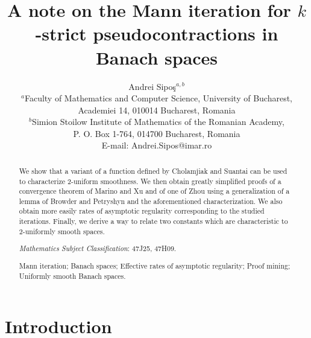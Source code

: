 \documentclass{article}
\title{A note on the Mann iteration for $k$-strict pseudocontractions in Banach spaces}
\author{Andrei Sipo\c s${}^{a,b}$\\[0.2cm]
\footnotesize ${}^a$Faculty of Mathematics and Computer Science, University of Bucharest,\\
\footnotesize Academiei 14, 010014 Bucharest, Romania\\[0.1cm]
\footnotesize ${}^b$Simion Stoilow Institute of Mathematics of the Romanian Academy,\\
\footnotesize P. O. Box 1-764, 014700 Bucharest, Romania\\[0.1cm]
\footnotesize E-mail: Andrei.Sipos@imar.ro
}
\date{}
\begin{document}
\maketitle

\begin{abstract}
We show that a variant of a function defined by Cholamjiak and Suantai can be used to characterize 2-uniform smoothness. We then obtain greatly simplified proofs of a convergence theorem of Marino and Xu and of one of Zhou using a generalization of a lemma of Browder and Petryshyn and the aforementioned characterization. We also obtain more easily rates of asymptotic regularity corresponding to the studied iterations. Finally, we derive a way to relate two constants which are characteristic to 2-uniformly smooth spaces.

 {\it Mathematics Subject Classification}: 47J25, 47H09.

 Mann iteration; Banach spaces; Effective rates of asymptotic regularity; Proof mining; Uniformly smooth Banach spaces.
\end{abstract}

\section{Introduction}
\end{document}
